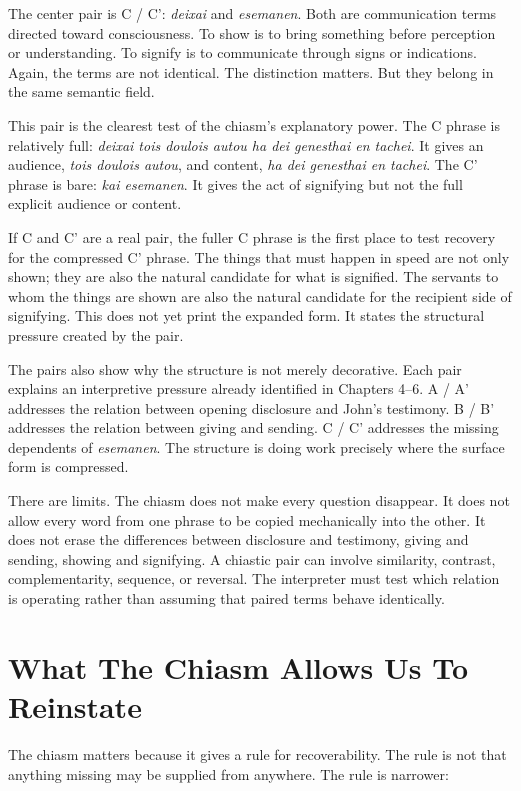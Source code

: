 The center pair is C / C': \textit{deixai} and \textit{esemanen}. Both are communication terms directed toward consciousness. To show is to bring something before perception or understanding. To signify is to communicate through signs or indications. Again, the terms are not identical. The distinction matters. But they belong in the same semantic field.

This pair is the clearest test of the chiasm's explanatory power. The C phrase is relatively full: \textit{deixai tois doulois autou ha dei genesthai en tachei}. It gives an audience, \textit{tois doulois autou}, and content, \textit{ha dei genesthai en tachei}. The C' phrase is bare: \textit{kai esemanen}. It gives the act of signifying but not the full explicit audience or content.

If C and C' are a real pair, the fuller C phrase is the first place to test recovery for the compressed C' phrase. The things that must happen in speed are not only shown; they are also the natural candidate for what is signified. The servants to whom the things are shown are also the natural candidate for the recipient side of signifying. This does not yet print the expanded form. It states the structural pressure created by the pair.

The pairs also show why the structure is not merely decorative. Each pair explains an interpretive pressure already identified in Chapters 4--6. A / A' addresses the relation between opening disclosure and John's testimony. B / B' addresses the relation between giving and sending. C / C' addresses the missing dependents of \textit{esemanen}. The structure is doing work precisely where the surface form is compressed.

There are limits. The chiasm does not make every question disappear. It does not allow every word from one phrase to be copied mechanically into the other. It does not erase the differences between disclosure and testimony, giving and sending, showing and signifying. A chiastic pair can involve similarity, contrast, complementarity, sequence, or reversal. The interpreter must test which relation is operating rather than assuming that paired terms behave identically.

\section{What The Chiasm Allows Us To Reinstate}

The chiasm matters because it gives a rule for recoverability. The rule is not that anything missing may be supplied from anywhere. The rule is narrower:

